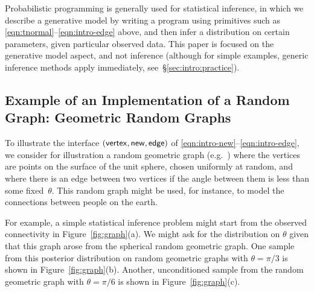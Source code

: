 Probabilistic programming is generally used for statistical inference, in which we describe a generative model by
writing a program using primitives such as \eqref{eqn:tnormal}--\eqref{eqn:intro-edge} above, and then infer a distribution on certain parameters, given particular observed data.  This paper is focused on the generative model aspect, and not inference (although for simple examples, generic inference methods apply immediately, see~\S\ref{sec:intro:practice}). 

\subsection{Example of an Implementation of a Random Graph: Geometric Random Graphs}
\label{sec:intro:graphs}

To illustrate the interface $(\mathsf{vertex},\mathsf{new},\mathsf{edge})$ of
\eqref{eqn:intro-new}--\eqref{eqn:intro-edge},
we consider for illustration a random geometric graph (e.g.~\cite{penrose-rgg,https://doi.org/10.1002/rsa.20633}) where the vertices are
points on the surface of the unit sphere, chosen uniformly at random, and where there is an
edge between two vertices if the angle between them is less than
some fixed~$\theta$.
This random graph might be used, for instance, to model the connections between people on the earth.

For example, a simple statistical inference problem might start from the observed connectivity in Figure~\ref{fig:graph}(a). 
We might ask for the distribution on $\theta$ given that this graph arose from the spherical random geometric graph. One sample from this posterior distribution on random geometric graphs with $\theta=\pi/3$ is shown in Figure~\ref{fig:graph}(b). Another, unconditioned sample from the random geometric graph with $\theta=\pi/6$ is shown in Figure~\ref{fig:graph}(c).  

